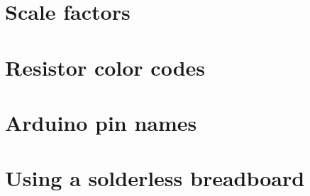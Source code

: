 \documentclass{article}
\begin{document}
\section{Scale factors}


\section{Resistor color codes}

\section{Arduino pin names}


\section{Using a solderless breadboard}
\end{document}
